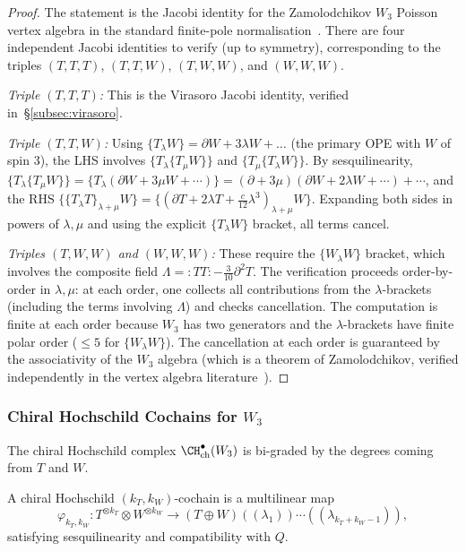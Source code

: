 \begin{proof}
The statement is the Jacobi identity for the Zamolodchikov
$W_3$ Poisson vertex algebra in the standard finite-pole
normalisation~\cite{BouFeiMal90}.
There are four independent Jacobi identities to verify (up to symmetry), corresponding to the triples $(T,T,T)$, $(T,T,W)$, $(T,W,W)$, and $(W,W,W)$.

\emph{Triple $(T,T,T)$:} This is the Virasoro Jacobi identity, verified in~\S\ref{subsec:virasoro}.

\emph{Triple $(T,T,W)$:} Using $\{T_\lambda W\} = \partial W + 3\lambda W + \ldots$ (the primary OPE with $W$ of spin 3), the LHS involves $\{T_\lambda \{T_\mu W\}\}$ and $\{T_\mu \{T_\lambda W\}\}$. By sesquilinearity, $\{T_\lambda \{T_\mu W\}\} = \{T_\lambda (\partial W + 3\mu W + \cdots)\} = (\partial + 3\mu)(\partial W + 2\lambda W + \cdots) + \cdots$, and the RHS $\{\{T_\lambda T\}_{\lambda+\mu} W\} = \{(\partial T + 2\lambda T + \frac{c}{12}\lambda^3)_{\lambda+\mu} W\}$. Expanding both sides in powers of $\lambda, \mu$ and using the explicit $\{T_\lambda W\}$ bracket, all terms cancel.

\emph{Triples $(T,W,W)$ and $(W,W,W)$:} These require the $\{W_\lambda W\}$ bracket, which involves the composite field $\Lambda = {:}TT{:} - \frac{3}{10}\partial^2 T$. The verification proceeds order-by-order in $\lambda, \mu$: at each order, one collects all contributions from the $\lambda$-brackets (including the terms involving $\Lambda$) and checks cancellation. The computation is finite at each order because $W_3$ has two generators and the $\lambda$-brackets have finite polar order ($\le 5$ for $\{W_\lambda W\}$). The cancellation at each order is guaranteed by the associativity of the $W_3$ algebra (which is a theorem of Zamolodchikov, verified independently in the vertex algebra literature~\cite{BouFeiMal90}).
\end{proof}

\subsubsection{Chiral Hochschild Cochains for $W_3$}

The chiral Hochschild complex $\CH^\bullet_{\text{ch}}(W_3)$ is bi-graded by the degrees coming from $T$ and $W$.

\begin{definition}
A chiral Hochschild $(k_T, k_W)$-cochain is a multilinear map
\begin{equation}
\varphi_{k_T, k_W}: T^{\otimes k_T} \otimes W^{\otimes k_W} \to (T \oplus W)((\lambda_1))\cdots((\lambda_{k_T+k_W-1})),
\end{equation}
satisfying sesquilinearity and compatibility with $Q$.
\end{definition}

